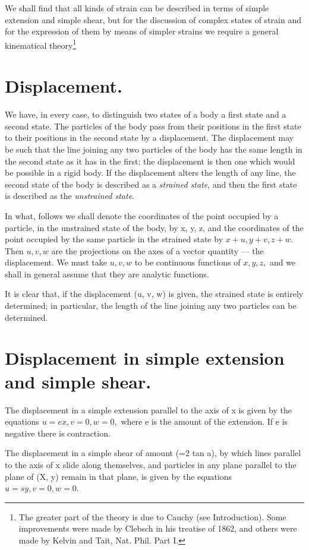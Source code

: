 We shall find that all kinds of strain can be described in terms of
simple extension and simple shear, but for the discussion of complex
states of strain and for the expression of them by means of simpler
strains we require a general kinematical theory\footnote{The greater
  part of the theory is due to Cauchy (see Introduction). Some
  improvements were made by Clebsch in his treatise of 1862, and others
  were made by Kelvin and Tait, Nat. Phil. Part I.}

\section{Displacement.} %

We have, in every case, to distinguish two states of a body a first
state and a second state. The particles of the body pass from their
positions in the first state to their positions in the second state by a
displacement. The displacement may be such that the line joining any two
particles of the body has the same length in the second state as it has
in the first; the displacement is then one which would be possible in a
rigid body. If the displacement alters the length of any line, the
second state of the body is described as a \textit{strained state}, and
then the first state is described as the \textit{unstrained state}.

In what, follows we shall denote the coordinates of the point occupied
by a particle, in the unstrained state of the body, by x, y, z, and the
coordinates of the point occupied by the same particle in the strained
state by \(x + u, y+v, z + w.\) Then \(u, v, w\) are the projections on
the axes of a vector quantity --- the displacement. We must take
\(u, v, w\) to be continuous functions of \(x, y, z,\) and we shall in
general assume that they are analytic functions.

It is clear that, if the displacement (u, v, w) is given, the strained
state is entirely determined; in particular, the length of the line
joining any two particles can be determined.

\section{Displacement in simple extension and simple shear.} %
The displacement in a simple extension parallel to the axis of x is
given by the equations \(u=ex, v=0, w=0,\) where e is the amount of
the extension. If e is negative there is contraction.

The displacement in a simple shear of amount (=2 tan a), by which lines
parallel to the axis of x slide along themselves, and particles in any
plane parallel to the plane of (X, y) remain in that plane, is given by
the equations \(u=s y, v=0, w=0.\)


